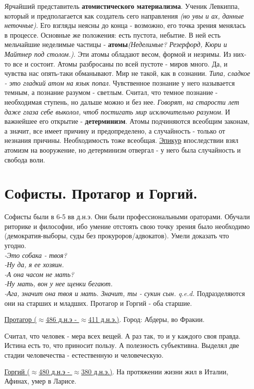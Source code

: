 \documentclass[12pt,a4paper]{article}
\begin{document}
Ярчайший представитель \textbf{атомистического материализма}.
Ученик Левкиппа, который и предполагается как создатель сего направления \textit{(но увы и ах, данные неточные)}.
Его взгляды неясны до конца - возможно, его точка зрения менялась в процессе. Основные же положения:
есть пустота, небытие. В ней есть мельчайшие неделимые частицы - \textbf{атомы}\textit{(Неделимые? Резерфорд, Кюри и Майтнер под столом.)}. Эти атомы обладают весом, формой и незримы. Из них-то все и состоит. Атомы разбросаны по всей пустоте - миров много. Да, и чувства нас опять-таки обманывают. Мир не такой, как в сознании. \textit{Типа, сладкое - это гладкий атом на язык попал}. Чувственное познание у него называется темным, а познание разумом - светлым. Считал, что темное познание - необходимая ступень, но дальше можно и без нее. \textit{Говорят, на старости лет даже глаза себе выколол, чтоб постигать мир исключительно разумом}. И важнейшее его открытие - \textbf{детерминизм}. Атомы подчиняются всеобщим законам, а значит, все имеет причину и предопределено, а случайность - только от незнания причины. Необходимость тоже всеобщая. \underline{Эпикур} впоследствии взял атомизм на вооружение, но детерминизм отвергал - у него была случайность и свобода воли.

\section{Софисты. Протагор и Горгий.}
Софисты были в 6-5 вв д.н.э. Они были профессиональными ораторами. Обучали риторике и философии, ибо умение отстоять свою точку зрения было необходимо (демократия-выборы, суды без прокуроров/адвокатов). Умели доказать что угодно.
\textit{\\-Это собака - твоя?\\ -Ну да, я ее хозяин.\\-А она часом не мать?\\-Ну мать, вон у нее щенки бегают.\\-Ага, значит она твоя и мать. Значит, ты - сукин сын. q.e.d.}
Подразделяются они на старших и младших. Протагор и Горгий - оба старшие.

\underline{Протагор ($\approx$486 д.н.э - $\approx$411 д.н.э.)}. Город: Абдеры, во Фракии.

Считал, что человек - мера всех вещей. А раз так, то и у каждого своя правда. Истина есть то, что приносит пользу. А полезность субъективна. Выделял две стадии человечества - естественную  и человеческую.

\underline{Горгий ($\approx$480 д.н.э - $\approx$380 д.н.э.)}. На протяжении жизни жил в Италии, Афинах, умер в Ларисе. 
\end{document}
